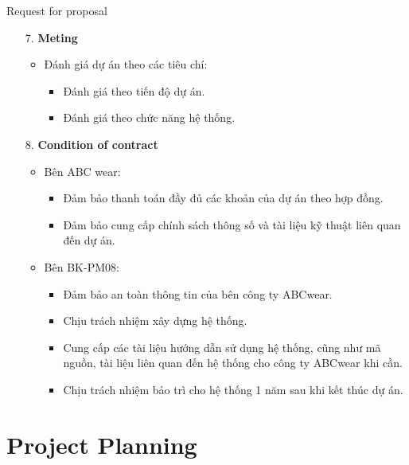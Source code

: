 \documentclass[compress]{beamer}
\begin{document}
\begin{frame}{Request for proposal}
\begin{itemize}
\item[7. ] \textbf{Meting}
\begin{itemize}
\item Đánh giá dự án theo các tiêu chí:
\begin{itemize}
\item Đánh giá theo tiến độ dự án.
\item Đánh giá theo chức năng hệ thống.
\end{itemize}
\end{itemize}
\item[8. ] \textbf{Condition of contract}
\begin{itemize}
\item Bên ABC wear:
\begin{itemize}
\item Đảm bảo thanh toán đầy đủ các khoản của dự án theo hợp đồng.
\item Đảm bảo cung cấp chính sách thông số và tài liệu kỹ thuật liên quan đến dự án.
\end{itemize}
\item Bên BK-PM08:
\begin{itemize}
\item Đảm bảo an toàn thông tin của bên công ty ABCwear.
\item Chịu trách nhiệm xây dựng hệ thống.
\item Cung cấp các tài liệu hướng dẫn sử dụng hệ thống, cũng như mã nguồn, tài liệu liên quan đến hệ thống cho công ty ABCwear khi cần.
\item Chịu trách nhiệm bảo trì cho hệ thống 1 năm sau khi kết thúc dự án.
\end{itemize}
\end{itemize}
\end{itemize}
\end{frame}
\section{Project Planning}
\end{document}
